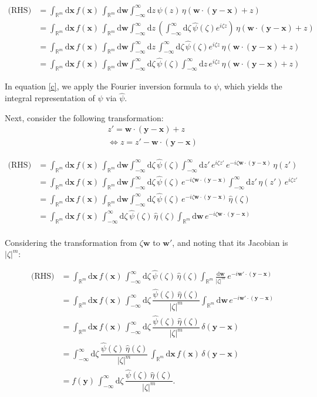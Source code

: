 \documentclass[a4paper,12pt]{article}
\newcommand{\intinf}{\int_{-\infty}^{\infty}}
\newcommand{\intrm}{\int_{\mathbb{R}^m}}
\newcommand{\z}{\zeta}
\newcommand{\vx}{\bm{x}}
\newcommand{\vy}{\bm{y}}
\newcommand{\vw}{\bm{w}}
\newcommand{\absz}{|\z|}
\newcommand{\dx}{\mathrm{d}\vx}
\newcommand{\dw}{\mathrm{d}\vw}
\newcommand{\dd}{\mathrm{d}}
\newcommand{\psihat}{\widehat{\psi}}
\newcommand{\etahat}{\widehat{\eta}}
\begin{document}
\begin{align}
  \text{(RHS)} &= \intrm \dx \, f(\vx) \, \intrm \dw \intinf \dd z \, \psi(z) \, \eta(\vw \cdot (\vy - \vx) + z)\\
  &= \intrm \dx \, f(\vx) \, \intrm \dw \intinf \dd z \, \left( \intinf \dd \z \, \psihat(\z) e^{i\z z}\right) \, \eta(\vw \cdot (\vy - \vx) + z) \label{c}\\
  &= \intrm \dx \, f(\vx) \, \intrm \dw \intinf \dd z \, \intinf \dd \z \, \psihat(\z) e^{i\z z} \, \eta(\vw \cdot (\vy - \vx) + z)\label{d}\\
  &= \intrm \dx \, f(\vx) \, \intrm \dw \intinf \dd \z \, \psihat(\z) \intinf \dd z \,e^{i\z z} \, \eta(\vw \cdot (\vy - \vx) + z)\label{e}
\end{align}

In equation \eqref{c}, we apply the Fourier inversion formula to $\psi$, which yields the integral representation of $\psi$ via $\psihat$.

\bigskip

Next, consider the following transformation:
\begin{align}
  z' = \vw \cdot (\vy - \vx) + z \\
  \iff z = z' - \vw \cdot (\vy - \vx)
\end{align}

\begin{align}
  \text{(RHS)} &= \intrm \dx \, f(\vx) \, \intrm \dw \intinf \dd \z \, \psihat(\z) \intinf \dd z' \, e^{i\z z'} \, e^{- i\z \vw \cdot (\vy - \vx)}\, \eta(z')\\
  &= \intrm \dx \, f(\vx) \, \intrm \dw \intinf \dd \z \, \psihat(\z) \, e^{- i\z \vw \cdot (\vy - \vx)} \intinf \dd z' \, \eta(z') \, e^{i\z z'} \\
  &= \intrm \dx \, f(\vx) \, \intrm \dw \intinf \dd \z \, \psihat(\z) \, e^{- i\z \vw \cdot (\vy - \vx)} \, \etahat(\z)\\
  &= \intrm \dx \, f(\vx) \, \intinf \dd \z \, \psihat(\z) \, \etahat(\z) \intrm \dw \, e^{- i\z \vw \cdot (\vy - \vx)}\\
\end{align}

Considering the transformation from $\z\vw$ to $\vw'$, and noting that its Jacobian is $\absz^m$:

\begin{align}
  \text{(RHS)} &= \intrm \dx \, f(\vx) \, \intinf \dd \z \, \psihat(\z) \, \etahat(\z) \intrm \frac{\dw}{\absz^m} \, e^{- i\vw' \cdot (\vy - \vx)}\\
  &= \intrm \dx \, f(\vx) \, \intinf \dd \z \, \dfrac{\psihat(\z) \, \etahat(\z)}{\absz^m} \intrm \dw \, e^{- i\vw' \cdot (\vy - \vx)}\\
  &= \intrm \dx \, f(\vx) \, \intinf \dd \z \, \dfrac{\psihat(\z) \, \etahat(\z)}{\absz^m} \, \delta(\vy - \vx)\\
  &=  \intinf \dd \z \, \dfrac{\psihat(\z) \, \etahat(\z)}{\absz^m} \, \intrm \dx \, f(\vx)  \, \delta(\vy - \vx)\\
  &= f(\vy) \, \intinf \dd \z \, \dfrac{\psihat(\z) \, \etahat(\z)}{\absz^m}. 
\end{align}
\end{document}
